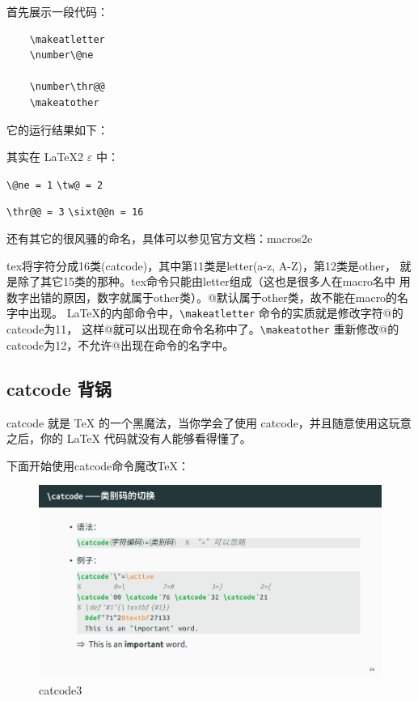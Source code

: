 \documentclass[fontset=windows, 12pt]{article}
\begin{document}
\begin{framed}
    \begin{minipage}[t]{0.45\linewidth}
        首先展示一段代码：
        \begin{verbatim}
    \makeatletter
    \number\@ne

    \number\thr@@
    \makeatother  
        \end{verbatim}
    \end{minipage}
    \hfill
    \begin{minipage}[t]{0.45\linewidth}
        它的运行结果如下：

        \makeatletter
        \number\@ne

        \number\thr@@
        \makeatother

        其实在 \LaTeX 2 $\varepsilon$ 中：

        \verb |\@ne = 1| \hspace*{3em} \verb |\tw@ = 2|

        \verb |\thr@@ = 3| \hspace*{3em} \verb |\sixt@@n = 16|

        还有其它的很风骚的命名，具体可以参见官方文档：macros2e
    \end{minipage}
\end{framed}


tex将字符分成16类(catcode)，其中第11类是letter(a-z, A-Z)，第12类是other，
就是除了其它15类的那种。tex命令只能由letter组成（这也是很多人在macro名中
用数字出错的原因，数字就属于other类）。@默认属于other类，故不能在macro的名字中出现。
LaTeX的内部命令中，\verb |\makeatletter| 命令的实质就是修改字符@的catcode为11，
这样@就可以出现在命令名称中了。\verb |\makeatother| 重新修改@的catcode为12，不允许@出现在命令的名字中。 


\newpage
\subsection{catcode 背锅}
catcode 就是 TeX 的一个黑魔法，当你学会了使用 catcode，并且随意使用这玩意之后，你的 LaTeX 代码就没有人能够看得懂了。

下面开始使用catcode命令魔改TeX：
\begin{figure}[!htb]
    \centering
    \includegraphics[scale=1]{catcode3.pdf}
    \caption{catcode3}
    \label{catcode3}
\end{figure}
\end{document}
